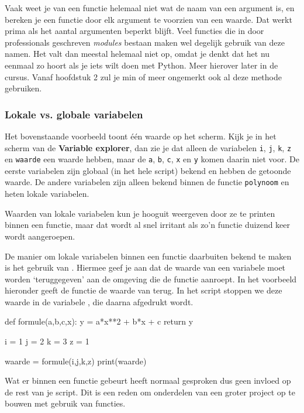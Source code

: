 \documentclass[a4paper,11pt, fleqn]{article}
\begin{document}
Vaak weet je van een functie helemaal niet wat de naam van een argument is, en bereken je een functie door elk argument te voorzien van een waarde. Dat werkt prima als het aantal argumenten beperkt blijft. 
Veel functies die in door professionals geschreven \textit{modules} bestaan maken wel degelijk gebruik van deze namen. Het valt dan meestal helemaal niet op, omdat je denkt dat het nu eenmaal zo hoort als je iets wilt doen met Python.
Meer hierover later in de cursus. Vanaf hoofdstuk 2 zul je min of meer ongemerkt ook al deze methode gebruiken.

\subsubsection{Lokale vs. globale variabelen}
Het bovenstaande voorbeeld toont \'e\'en waarde op het scherm. Kijk je in het scherm van de \textbf{Variable explorer}, dan zie je dat alleen de variabelen \verb.i., \verb.j., \verb.k., \verb.z. en \verb.waarde. een waarde hebben, maar de \verb.a., \verb.b., \verb.c., \verb.x. en \verb.y. komen daarin niet voor.
De eerste variabelen zijn globaal (in het hele script) bekend en hebben de getoonde waarde. De andere variabelen zijn alleen bekend binnen de functie \verb.polynoom. en heten lokale variabelen. 

Waarden van lokale variabelen kun je hooguit weergeven door ze te printen binnen een functie, maar dat wordt al snel irritant als zo'n functie duizend keer wordt aangeroepen. 

De manier om lokale variabelen binnen een functie daarbuiten bekend te maken is het gebruik van . Hiermee geef je aan dat de waarde van een variabele moet worden `teruggegeven' aan de omgeving die de functie aanroept. In het voorbeeld hieronder geeft de functie  de waarde van  terug. In het script stoppen we deze waarde in de variabele , die daarna afgedrukt wordt.

\begin{python}
def formule(a,b,c,x):
    y = a*x**2 + b*x + c
    return y

i = 1
j = 2
k = 3
z = 1

waarde = formule(i,j,k,z)
print(waarde)
\end{python}

Wat er binnen een functie gebeurt heeft normaal gesproken dus geen invloed op de rest van je script. Dit is een reden om onderdelen van een groter project op te bouwen met gebruik van functies.
\end{document}
